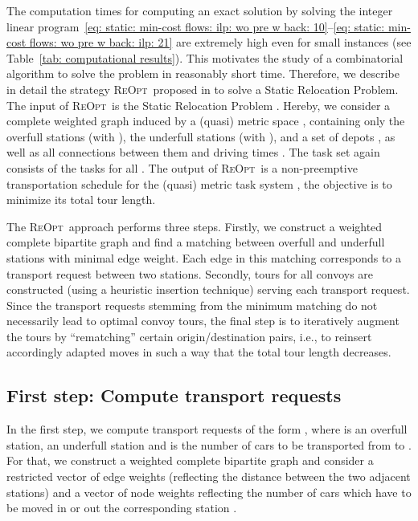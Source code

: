 \documentclass[english]{llncs}
\numberwithin{sublemma}{lemma}
\newcommand{\REOPT}{\textsc{ReOpt}\xspace}
\begin{document}
The computation times for computing an exact solution by solving the integer linear program~\eqref{eq: static: min-cost flows: ilp: wo pre w back: 10}--\eqref{eq: static: min-cost flows: wo pre w back: ilp: 21}
are extremely high even for small instances (see Table~\ref{tab: computational results}).
This motivates the study of a combinatorial algorithm to solve the problem in reasonably short time.
Therefore, we describe in detail the strategy \REOPT\ proposed in \cite{LAGOS2013} to solve a Static Relocation Problem.
The input of \REOPT\ is the Static Relocation Problem .
Hereby, we consider a complete weighted graph  induced by a (quasi) metric space , containing only the overfull stations  (with ),
the underfull stations  (with ), and a set of depots , as well as all connections  between them and driving times .
The task set  again consists of the tasks  for all .
The output of \REOPT\ is a non-preemptive transportation schedule for the (quasi) metric task system , the objective is to minimize its total tour length.

The \REOPT\ approach performs three steps.
Firstly, we construct a weighted complete bipartite graph and find a matching between overfull and underfull stations with minimal edge weight.
Each edge in this matching corresponds to a transport request between two stations.
Secondly, tours for all convoys are constructed (using a heuristic insertion technique) serving each transport request.
Since the transport requests stemming from the minimum matching do not necessarily lead to optimal convoy tours, 
the final step is to iteratively augment the tours by ``rematching'' certain origin/destination pairs, i.e., to reinsert accordingly adapted moves in such a way that the total tour length decreases.



\subsection{First step: Compute transport requests}
\label{sec: static: reopt: first step}


In the first step, we compute transport requests of the form , where  is an overfull station,  an underfull station and  is the number of cars to be transported from  to . 
For that, we construct a weighted complete bipartite graph  and
consider a restricted vector  of edge weights (reflecting the distance between the two adjacent stations)
and a vector  of node weights reflecting the number  of cars which have to be moved in or out the corresponding station .
\end{document}
